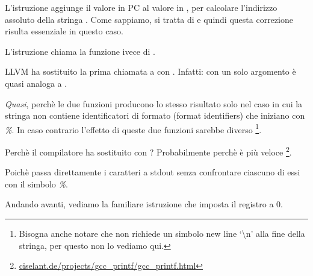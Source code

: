 L'istruzione  aggiunge il valore in \ac{PC} al valore in , per calcolare l'indirizzo assoluto della stringa .
Come sappiamo, si tratta di \q{\PICcode} e quindi questa correzione risulta essenziale in questo caso.

L'istruzione  chiama la funzione \puts ivece di \printf.

\label{puts}

LLVM ha sostituito la prima chiamata a \printf con \puts.
Infatti: \printf con un solo argomento è quasi analoga a \puts.

\emph{Quasi}, perchè le due funzioni producono lo stesso risultato solo nel caso in cui la stringa non contiene
identificatori di formato (format identifiers) che iniziano con \emph{\%}.
In caso contrario l'effetto di queste due funzioni sarebbe diverso
\footnote{Bisogna anche notare che \puts non richiede un simbolo new line `\textbackslash{}n' alla fine della stringa,
per questo non lo vediamo qui.}.

Perchè il compilatore ha sostituito \printf con \puts? Probabilmente perchè \puts è più veloce
\footnote{\href{http://go.yurichev.com/17063}{ciselant.de/projects/gcc\_printf/gcc\_printf.html}}.

Poichè passa direttamente i caratteri a \gls{stdout} senza confrontare ciascuno di essi con il simbolo \emph{\%}.

Andando avanti, vediamo la familiare istruzione  che imposta il registro  a 0.

